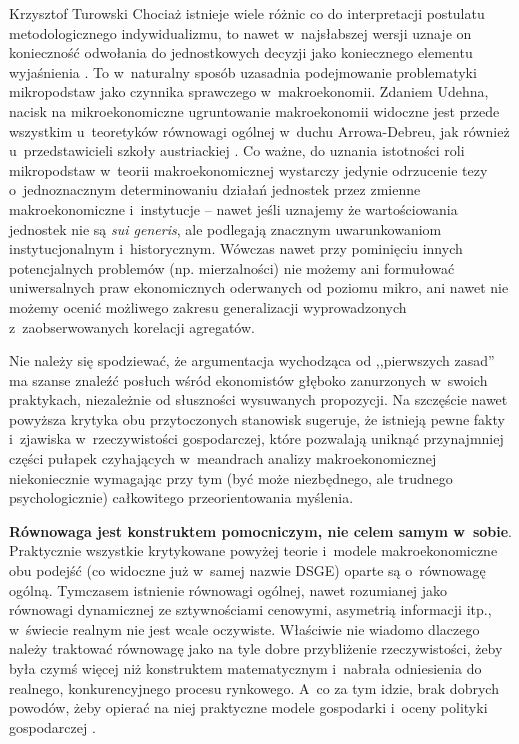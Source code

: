 \begin{artplenv}{Krzysztof Turowski}
Chociaż istnieje wiele różnic co do interpretacji postulatu metodologicznego indywidualizmu, to nawet w~najsłabszej
wersji uznaje on konieczność odwołania do jednostkowych decyzji jako koniecznego elementu wyjaśnienia
\parencite{udehn_methodological_2001}.
To w~naturalny sposób uzasadnia podejmowanie problematyki mikropodstaw jako
czynnika sprawczego w~makroekonomii. Zdaniem Udehna, nacisk na mikroekonomiczne ugruntowanie makroekonomii widoczne
jest przede wszystkim u~teoretyków równowagi ogólnej w~duchu Arrowa-Debreu, jak również u~przedstawicieli szkoły
austriackiej
\parencite{udehn_changing_2002}.
Co ważne, do uznania istotności roli mikropodstaw w~teorii
makroekonomicznej wystarczy jedynie odrzucenie tezy o~jednoznacznym determinowaniu działań jednostek przez zmienne
makroekonomiczne i~instytucje -- nawet jeśli uznajemy że wartościowania jednostek nie są \textit{sui generis}, ale
podlegają znacznym uwarunkowaniom instytucjonalnym i~historycznym. Wówczas nawet przy pominięciu innych potencjalnych
problemów (np. mierzalności) nie możemy ani formułować uniwersalnych praw ekonomicznych oderwanych od poziomu mikro,
ani nawet nie możemy ocenić możliwego zakresu generalizacji wyprowadzonych z~zaobserwowanych korelacji agregatów.

Nie należy się spodziewać, że argumentacja wychodząca od ,,pierwszych zasad'' ma szanse znaleźć posłuch wśród ekonomistów
głęboko zanurzonych w~swoich praktykach, niezależnie od słuszności wysuwanych propozycji. Na szczęście nawet powyższa
krytyka obu przytoczonych stanowisk sugeruje, że istnieją pewne fakty i~zjawiska w~rzeczywistości gospodarczej, które
pozwalają uniknąć przynajmniej części pułapek czyhających w~meandrach analizy makroekonomicznej niekoniecznie wymagając
przy tym (być może niezbędnego, ale trudnego psychologicznie) całkowitego przeorientowania myślenia.

\textbf{Równowaga jest konstruktem pomocniczym, nie celem samym w~sobie}. Praktycznie wszystkie krytykowane powyżej
teorie i~modele makroekonomiczne obu podejść (co widoczne już w~samej nazwie DSGE) oparte są o~równowagę ogólną.
Tymczasem istnienie równowagi ogólnej, nawet rozumianej jako równowagi dynamicznej ze sztywnościami cenowymi, asymetrią
informacji itp., w~świecie realnym nie jest wcale oczywiste. Właściwie nie wiadomo dlaczego należy traktować równowagę
jako na tyle dobre przybliżenie rzeczywistości, żeby była czymś więcej niż konstruktem matematycznym i~nabrała
odniesienia do realnego, konkurencyjnego procesu rynkowego. A~co za tym idzie, brak dobrych powodów, żeby opierać na
niej praktyczne modele gospodarki i~oceny polityki gospodarczej
\parencite{blaug_formalist_2003}.


\end{artplenv}
